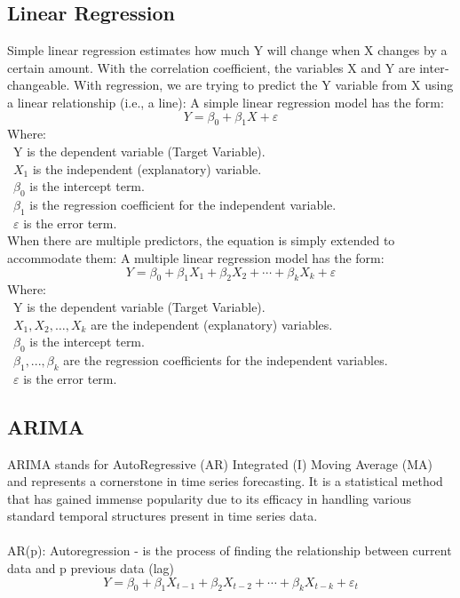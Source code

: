 \documentclass{ieeeojies}
\begin{document}
\subsection{Linear Regression}
Simple linear regression estimates how much Y will change when X changes by a
certain amount. With the correlation coefficient, the variables X and Y are inter‐
changeable. With regression, we are trying to predict the Y variable from X using a
linear relationship (i.e., a line):
A simple linear regression model has the form: 
\[Y=\beta_0+\beta_1X+\varepsilon\]
Where:\\
	\indent\textbullet\ Y is the dependent variable (Target Variable).\\
	\indent\textbullet\ \(X_1\) is the independent (explanatory) variable.\\
	\indent\textbullet\ \(\beta_0\) is the intercept term.\\
	\indent\textbullet\ \(\beta_1\) is the regression coefficient for the independent variable.\\
	\indent\textbullet\ \(\varepsilon\) is the error term.\\

When there are multiple predictors, the equation is simply extended to accommodate
them:
A multiple linear regression model has the form: 
\[Y=\beta_0+\beta_1X_1+\beta_2X_2+\cdots+\beta_kX_k+\varepsilon\]
Where:\\
	\indent\textbullet\ Y is the dependent variable (Target Variable).\\
	\indent\textbullet\ \(X_1, X_2, \ldots, X_k\) are the independent (explanatory) variables.\\
	\indent\textbullet\ \(\beta_0\) is the intercept term.\\
	\indent\textbullet\ \(\beta_1,..., \beta_k\) are the regression coefficients for the independent variables.\\
	\indent\textbullet\ \(\varepsilon\) is the error term.

\subsection{ARIMA}
\indent ARIMA stands for AutoRegressive (AR) Integrated (I) Moving Average (MA) and represents a cornerstone in time series forecasting. It is a statistical method that has gained immense popularity due to its efficacy in handling various standard temporal structures present in time series data.\\
\\
\indent AR(p): Autoregression - is the process of finding the relationship between
current data and p previous data (lag)
\[Y=\beta_0+\beta_1X_{t-1}+\beta_2X_{t-2}+\cdots+\beta_kX_{t-k}+\varepsilon_{t}\]
\end{document}

